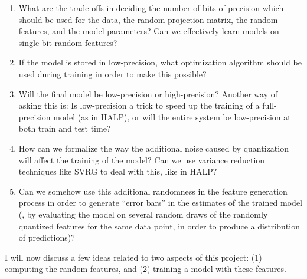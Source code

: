 \documentclass[12pt]{article}
\begin{document}
\begin{enumerate}
	\item What are the trade-offs in deciding the number of bits of precision which should be used for the data, the random projection matrix, the random features, and the model parameters?  Can we effectively learn models on single-bit random features?
	\item If the model is stored in low-precision, what optimization algorithm should be used during training in order to make this possible?
	\item Will the final model be low-precision or high-precision?  Another way of asking this is: Is low-precision a trick to speed up the training of a full-precision model (as in HALP), or will the entire system be low-precision at both train and test time?
	\item How can we formalize the way the additional noise caused by quantization will affect the training of the model?  Can we use variance reduction techniques like SVRG to deal with this, like in HALP?
	\item Can we somehow use this additional randomness in the feature generation process in order to generate ``error bars'' in the estimates of the trained model (\eg, by evaluating the model on several random draws of the randomly quantized features for the same data point, in order to produce a distribution of predictions)?
\end{enumerate}

I will now discuss a few ideas related to two aspects of this project: (1) computing the random features, and (2) training a model with these features.
\end{document}
